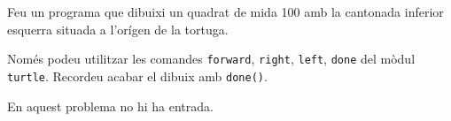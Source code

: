 

\Statement

Feu un programa que dibuixi un quadrat de mida 100 amb la cantonada inferior esquerra
situada a l'orígen de la tortuga.

\medskip

Només podeu utilitzar les comandes 
\texttt{forward},
\texttt{right},
\texttt{left},
\texttt{done} del mòdul \texttt{turtle}.
Recordeu acabar el dibuix amb \texttt{done()}.

\medskip 

En aquest problema no hi ha entrada.

\Sample

